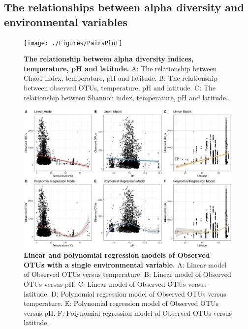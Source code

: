 \subsection{The relationships between alpha diversity and environmental variables}

\begin{figure}[H]
    \centering
    \texttt{[image: ./Figures/PairsPlot]}
    \caption{\textbf{The relationship between alpha diversity indices, temperature, pH and latitude.} A: The relationship between Chao1 index, temperature, pH and latitude. B: The relationship between observed OTUs, temperature, pH and latitude. C: The relationship between Shannon index, temperature, pH and latitude..}
    \label{fig:Pairs}
\end{figure}

\begin{figure}[H]
    \centering
    \includegraphics[scale=0.33]{./Figures/OO_LM_PM_simpleTpL}
    \caption{\textbf{Linear and polynomial regression models of Observed OTUs with a single environmental variable.} A: Linear model of Observed OTUs versus temperature. B: Linear model of Observed OTUs versus pH. C: Linear model of Observed OTUs versus latitude. D: Polynomial regression model of Observed OTUs versus temperature. E: Polynomial regression model of Observed OTUs versus pH. F: Polynomial regression model of Observed OTUs versus latitude.}
    \label{fig:OO_simpleTpL}
\end{figure}

